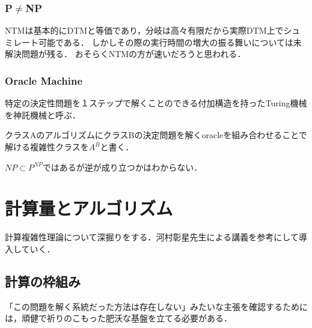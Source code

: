 \documentclass[uplatex, 12pt, dvipdfmx]{jsreport}
\begin{document}
\subsection{P$\ne$NP}
NTMは基本的にDTMと等価であり，分岐は高々有限だから実際DTM上でシュミレート可能である．
しかしその際の実行時間の増大の振る舞いについては未解決問題が残る．
おそらくNTMの方が速いだろうと思われる．

\begin{example}
    
\end{example}

\subsection{Oracle Machine}
\begin{definition}
    特定の決定性問題を１ステップで解くことのできる付加構造を持ったTuring機械を神託機械と呼ぶ．
\end{definition}
\begin{notation}
    クラスAのアルゴリズムにクラスBの決定問題を解くoracleを組み合わせることで解ける複雑性クラスを$A^B$と書く．
\end{notation}
$NP\subset P^{NP}$ではあるが逆が成り立つかはわからない．

\chapter{計算量とアルゴリズム}
計算複雑性理論について深掘りをする．河村彰星先生による講義を参考にして導入していく．

\section{計算の枠組み}
「この問題を解く系統だった方法は存在しない」みたいな主張を確認するためには，頑健で祈りのこもった肥沃な基盤を立てる必要がある．
\end{document}
